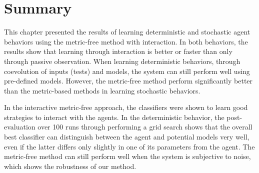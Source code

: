 \section{Summary}\label{sec:summary_interaction}


This chapter presented the results of learning deterministic and stochastic agent behaviors using the metric-free method with interaction. In both behaviors, the results show that learning through interaction is better or faster than only through passive observation. When learning deterministic behaviors, through coevolution of inputs (tests) and models, the system can still perform well using pre-defined models. However, the metric-free method perform significantly better than the metric-based methods in learning stochastic behaviors.

In the interactive metric-free approach, the classifiers were shown to learn good strategies to interact with the agents. In the deterministic behavior, the post-evaluation over 100 runs through performing a grid search shows that the overall best classifier can distinguish between the agent and potential models very well, even if the latter differs only slightly in one of its parameters from the agent. The metric-free method can still perform well when the system is subjective to noise, which shows the robustness of our method. 



